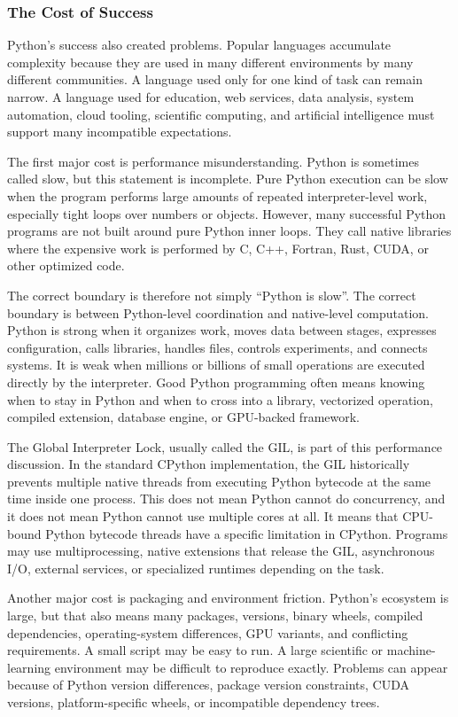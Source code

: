 \subsubsection{The Cost of Success}

Python's success also created problems. Popular languages accumulate complexity because they are used in many different environments by many different communities. A language used only for one kind of task can remain narrow. A language used for education, web services, data analysis, system automation, cloud tooling, scientific computing, and artificial intelligence must support many incompatible expectations.

The first major cost is performance misunderstanding. Python is sometimes called slow, but this statement is incomplete. Pure Python execution can be slow when the program performs large amounts of repeated interpreter-level work, especially tight loops over numbers or objects. However, many successful Python programs are not built around pure Python inner loops. They call native libraries where the expensive work is performed by C, C++, Fortran, Rust, CUDA, or other optimized code.

The correct boundary is therefore not simply ``Python is slow''. The correct boundary is between Python-level coordination and native-level computation. Python is strong when it organizes work, moves data between stages, expresses configuration, calls libraries, handles files, controls experiments, and connects systems. It is weak when millions or billions of small operations are executed directly by the interpreter. Good Python programming often means knowing when to stay in Python and when to cross into a library, vectorized operation, compiled extension, database engine, or GPU-backed framework.

The Global Interpreter Lock, usually called the GIL, is part of this performance discussion. In the standard CPython implementation, the GIL historically prevents multiple native threads from executing Python bytecode at the same time inside one process. This does not mean Python cannot do concurrency, and it does not mean Python cannot use multiple cores at all. It means that CPU-bound Python bytecode threads have a specific limitation in CPython. Programs may use multiprocessing, native extensions that release the GIL, asynchronous I/O, external services, or specialized runtimes depending on the task.

Another major cost is packaging and environment friction. Python's ecosystem is large, but that also means many packages, versions, binary wheels, compiled dependencies, operating-system differences, GPU variants, and conflicting requirements. A small script may be easy to run. A large scientific or machine-learning environment may be difficult to reproduce exactly. Problems can appear because of Python version differences, package version constraints, CUDA versions, platform-specific wheels, or incompatible dependency trees.

